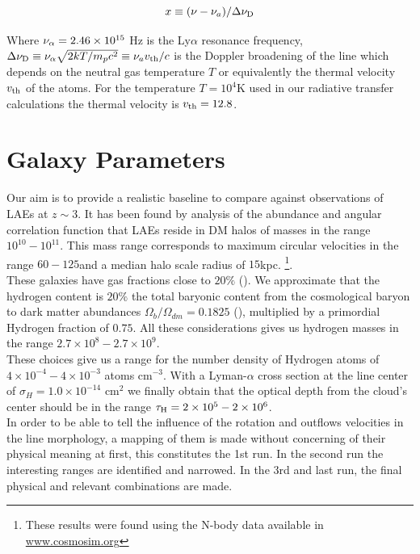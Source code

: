 \begin{equation}
x\equiv (\nu -\nu_a)/\Delta\nu_{\rm D}
\end{equation} 

Where $\nu_{\rm \alpha}=2.46\times 10^{15}$ Hz is the Ly$\alpha$ resonance frequency,  $\Delta\nu_{\rm D} \equiv \nu_{\alpha}\sqrt{2kT/m_pc^2}\equiv \nu_av_{\rm th}/c $ is the Doppler broadening of the line which depends on the neutral gas temperature $T$ or equivalently the thermal velocity $v_{\rm th}$ of the atoms. For the temperature $T=10^4$K used in our radiative transfer calculations the thermal velocity is $v_{\rm th}=12.8$\kms.   \\

\section{Galaxy Parameters}

Our aim is to provide a realistic baseline to compare against observations of LAEs at $z\sim 3$. It has been found by analysis of the abundance and angular correlation function that LAEs reside in DM halos of masses in the range $10^{10}-10^{11}$\Msun \cite{WalkerSoler2012}. This mass range corresponds to maximum circular velocities in the range $60-125$\kms and a median halo scale radius of $15$kpc. \footnote{These results were found using the  N-body data available in \url{www.cosmosim.org}}. \\

These galaxies have gas fractions close to $20\%$ (\cite{Narayanan2012}). We approximate that the hydrogen content is $20\%$ the total baryonic content from the cosmological baryon to dark matter  abundances $\Omega_b/\Omega_{dm}=0.1825$ (\cite{Planck2015}), multiplied by a primordial Hydrogen fraction of $0.75$. All these considerations gives us hydrogen masses in the range $2.7\times 10^{8}-2.7\times 10^{9}$\Msun.\\

These choices give us a range for the number density of Hydrogen atoms of $4\times10^{-4}-4\times 10^{-3}$ atoms cm$^{-3}$. With a Lyman-$\alpha$ cross section at the line center of $\sigma_{H}=1.0\times 10^{-14}$ cm$^{2}$ we finally obtain that the optical depth from the cloud's center  should be in the range $\tau_{\rm H}=2 \times 10^{5} - 2 \times 10^{6}$.  \\

In order to be able to tell the influence of the rotation and outflows velocities in the \lya line morphology, a mapping of them is made without concerning of their physical meaning at first, this constitutes the 1st run. In the second run the interesting ranges are identified and narrowed. In the 3rd and last run, the final physical and relevant combinations are made. \\


